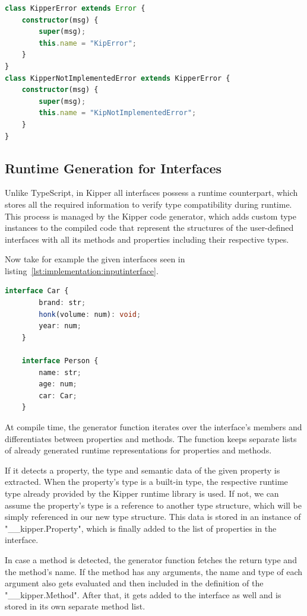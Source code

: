 \begin{lstlisting}[language=Typescript,caption=Kipper error types,label=lst:implementation:kippererrortypes]
class KipperError extends Error {
	constructor(msg) {
		super(msg);
		this.name = "KipError";
	}
}
class KipperNotImplementedError extends KipperError {
	constructor(msg) {
		super(msg);
		this.name = "KipNotImplementedError";
	}
}
\end{lstlisting}

\subsection{Runtime Generation for Interfaces}

Unlike TypeScript, in Kipper all interfaces possess a runtime counterpart, which stores all the required information to verify type compatibility during runtime. This process is managed by the Kipper code generator, which adds custom type instances to the compiled code that represent the structures of the user-defined interfaces with all its methods and properties including their respective types.

Now take for example the given interfaces seen in listing~\ref{lst:implementation:inputinterface}.

\begin{lstlisting}[language=Typescript,caption=Example interfaces in the Kipper language,label=lst:implementation:inputinterface]
	interface Car {
		brand: str;
		honk(volume: num): void;
		year: num;
	}

	interface Person {
		name: str;
		age: num;
		car: Car;
	}
\end{lstlisting}

At compile time, the generator function iterates over the interface's members and differentiates between properties and methods. The function keeps separate lists of already generated runtime representations for properties and methods.

If it detects a property, the type and semantic data of the given property is extracted. When the property's type is a built-in type, the respective runtime type already provided by the Kipper runtime library is used. If not, we can assume the property's type is a reference to another type structure, which will be simply referenced in our new type structure. This data is stored in an instance of "\_\_kipper.Property", which is finally added to the list of properties in the interface.

In case a method is detected, the generator function fetches the return type and the method's name. If the method has any arguments, the name and type of each argument also gets evaluated and then included in the definition of the "\_\_kipper.Method". After that, it gets added to the interface as well and is stored in its own separate method list.

